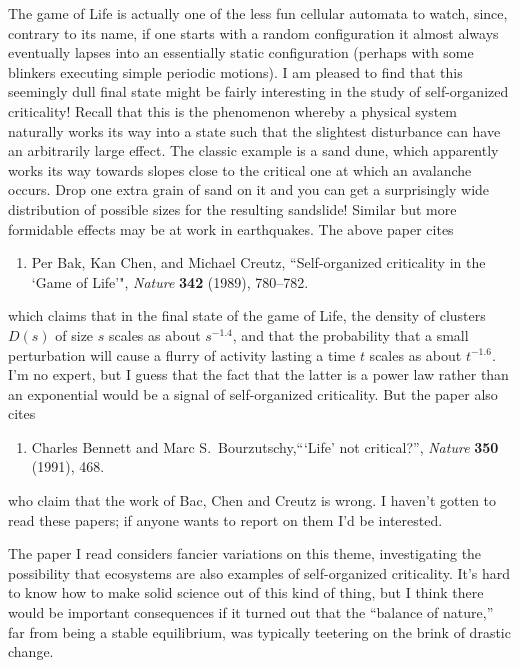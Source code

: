 \documentclass{article}
\def\tightlist{}
\begin{document}
The game of Life is actually one of the less fun cellular automata to
watch, since, contrary to its name, if one starts with a random
configuration it almost always eventually lapses into an essentially
static configuration (perhaps with some blinkers executing simple
periodic motions). I am pleased to find that this seemingly dull final
state might be fairly interesting in the study of self-organized
criticality! Recall that this is the phenomenon whereby a physical
system naturally works its way into a state such that the slightest
disturbance can have an arbitrarily large effect. The classic example is
a sand dune, which apparently works its way towards slopes close to the
critical one at which an avalanche occurs. Drop one extra grain of sand
on it and you can get a surprisingly wide distribution of possible sizes
for the resulting sandslide! Similar but more formidable effects may be
at work in earthquakes. The above paper cites

\begin{enumerate}
\def\labelenumi{\arabic{enumi})}
\setcounter{enumi}{1}
\tightlist
\item
Per Bak, Kan Chen, and Michael Creutz, ``Self-organized criticality in the `Game of Life'",
\emph{Nature} \textbf{342} (1989), 780--782.
\end{enumerate}
\noindent
which claims that in the final state of the game of Life, the density of
clusters \(D(s)\) of size \(s\) scales as about \(s^{-1.4}\), and that
the probability that a small perturbation will cause a flurry of
activity lasting a time \(t\) scales as about \(t^{-1.6}\). I'm no
expert, but I guess that the fact that the latter is a power law rather
than an exponential would be a signal of self-organized criticality. But
the paper also cites

\begin{enumerate}
\def\labelenumi{\arabic{enumi})}
\setcounter{enumi}{2}
\tightlist
\item
Charles Bennett and Marc S.\ Bourzutschy,```Life' not critical?'', 
\emph{Nature} \textbf{350} (1991), 468.
\end{enumerate}
\noindent
who claim that the work of Bac, Chen and Creutz is wrong. I haven't
gotten to read these papers; if anyone wants to report on them I'd be
interested.

The paper I read considers fancier variations on this theme,
investigating the possibility that ecosystems are also examples of
self-organized criticality. It's hard to know how to make solid science
out of this kind of thing, but I think there would be important
consequences if it turned out that the ``balance of nature,'' far from
being a stable equilibrium, was typically teetering on the brink of
drastic change.
\end{document}
